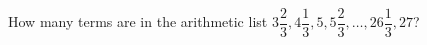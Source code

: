 How many terms are in the arithmetic list $3\dfrac{2}{3},4\dfrac{1}{3},5,5\dfrac{2}{3},\ldots,26\dfrac{1}{3},27$?

